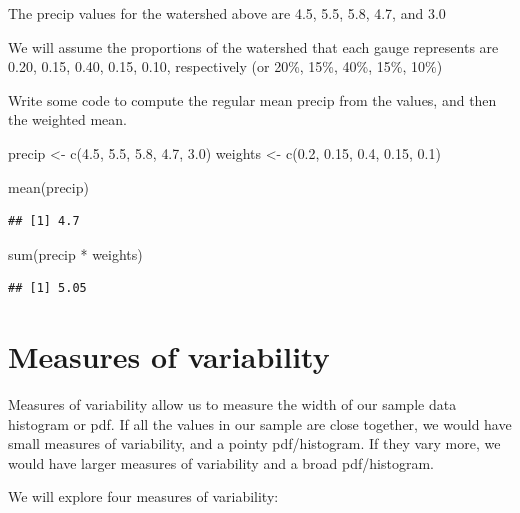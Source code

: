 \documentclass[
]{book}
\newenvironment{Shaded}{\begin{snugshade}}{\end{snugshade}}
\newcommand{\FloatTok}[1]{\textcolor[rgb]{0.00,0.00,0.81}{#1}}
\newcommand{\FunctionTok}[1]{\textcolor[rgb]{0.00,0.00,0.00}{#1}}
\newcommand{\NormalTok}[1]{#1}
\newcommand{\OtherTok}[1]{\textcolor[rgb]{0.56,0.35,0.01}{#1}}
\newcommand{\SpecialCharTok}[1]{\textcolor[rgb]{0.00,0.00,0.00}{#1}}
\begin{document}
The precip values for the watershed above are 4.5, 5.5, 5.8, 4.7, and 3.0

We will assume the proportions of the watershed that each gauge represents are 0.20, 0.15, 0.40, 0.15, 0.10, respectively (or 20\%, 15\%, 40\%, 15\%, 10\%)

Write some code to compute the regular mean precip from the values, and then the weighted mean.

\begin{Shaded}
\begin{Highlighting}[]
\NormalTok{precip }\OtherTok{\textless{}{-}} \FunctionTok{c}\NormalTok{(}\FloatTok{4.5}\NormalTok{, }\FloatTok{5.5}\NormalTok{, }\FloatTok{5.8}\NormalTok{, }\FloatTok{4.7}\NormalTok{, }\FloatTok{3.0}\NormalTok{)}
\NormalTok{weights }\OtherTok{\textless{}{-}} \FunctionTok{c}\NormalTok{(}\FloatTok{0.2}\NormalTok{, }\FloatTok{0.15}\NormalTok{, }\FloatTok{0.4}\NormalTok{, }\FloatTok{0.15}\NormalTok{, }\FloatTok{0.1}\NormalTok{)}

\FunctionTok{mean}\NormalTok{(precip)}
\end{Highlighting}
\end{Shaded}

\begin{verbatim}
## [1] 4.7
\end{verbatim}

\begin{Shaded}
\begin{Highlighting}[]
\FunctionTok{sum}\NormalTok{(precip }\SpecialCharTok{*}\NormalTok{ weights)}
\end{Highlighting}
\end{Shaded}

\begin{verbatim}
## [1] 5.05
\end{verbatim}

\hypertarget{measures-of-variability}{%
\section{Measures of variability}\label{measures-of-variability}}

Measures of variability allow us to measure the width of our sample data histogram or pdf. If all the values in our sample are close together, we would have small measures of variability, and a pointy pdf/histogram. If they vary more, we would have larger measures of variability and a broad pdf/histogram.

We will explore four measures of variability:
\end{document}
